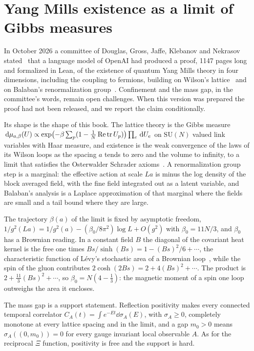 \section{Yang Mills existence as a limit of Gibbs measures}\label{sec:yangmills}

In October 2026 a committee of Douglas, Gross, Jaffe, Klebanov and Nekrasov stated~\cite{kitp2026ym} that a language model of OpenAI had produced a proof, 1147 pages long and formalized in Lean, of the existence of quantum Yang Mills theory in four dimensions, including the coupling to fermions, building on Wilson's lattice~\cite{wilson1974} and on Balaban's renormalization group~\cite{balaban1987}. Confinement and the mass gap, in the committee's words, remain open challenges. When this version was prepared the proof had not been released, and we report the claim conditionally.

Its shape is the shape of this book. The lattice theory is the Gibbs measure $\,\mathrm{d}\mu_{a,\beta}(U)\propto\exp\bigl(-\beta\sum_p(1-\frac1N\,\mathrm{Re}\,\mathrm{tr}\, U_p)\bigr)\prod_e\,\mathrm{d} U_e$ on $\mathrm{SU}(N)$ valued link variables with Haar measure, and existence is the weak convergence of the laws of its Wilson loops as the spacing $a$ tends to zero and the volume to infinity, to a limit that satisfies the Osterwalder Schrader axioms~\cite{osterwalder1973,osterwalder1975}. A renormalization group step is a marginal: the effective action at scale $La$ is minus the log density of the block averaged field, with the fine field integrated out as a latent variable, and Balaban's analysis is a Laplace approximation of that marginal where the fields are small and a tail bound where they are large.

The trajectory $\beta(a)$ of the limit is fixed by asymptotic freedom, $1/g^2(La) = 1/g^2(a)-(\beta_0/8\pi^2)\log L+O(g^2)$ with $\beta_0 = 11N/3$, and $\beta_0$ has a Brownian reading. In a constant field $B$ the diagonal of the covariant heat kernel is the free one times $Bs/\sinh(Bs) = 1-(Bs)^2/6+\cdots$, the characteristic function of L\'evy's stochastic area of a Brownian loop~\cite{revuzyor}, while the spin of the gluon contributes $2\cosh(2Bs) = 2+4(Bs)^2+\cdots$. The product is $2+\frac{11}{3}(Bs)^2+\cdots$, so $\beta_0 = N(4-\frac13)$: the magnetic moment of a spin one loop outweighs the area it encloses.

The mass gap is a support statement. Reflection positivity makes every connected temporal correlator $C_A(t) = \int e^{-Et}\dd\sigma_A(E)$, with $\sigma_A\geq0$, completely monotone at every lattice spacing and in the limit, and a gap $m_0>0$ means $\sigma_A((0,m_0)) = 0$ for every gauge invariant local observable $A$. As for the reciprocal $\Xi$ function, positivity is free and the support is hard.


